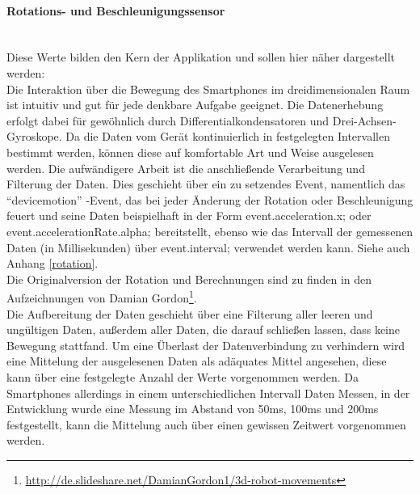 \documentclass[a4paper]{spie}  %
\begin{document}
		\paragraph{Rotations- und Beschleunigungssensor}\mbox{}\\
Diese Werte bilden den Kern der Applikation und sollen hier näher dargestellt werden:\\
Die Interaktion über die Bewegung des Smartphones im dreidimensionalen Raum ist intuitiv und gut für jede denkbare Aufgabe geeignet. Die Datenerhebung erfolgt dabei für gewöhnlich durch Differentialkondensatoren und Drei-Achsen-Gyroskope.
Da die Daten vom Gerät kontinuierlich in festgelegten Intervallen bestimmt werden, können diese auf komfortable Art und Weise ausgelesen werden. Die aufwändigere Arbeit ist die anschließende Verarbeitung und Filterung der Daten. Dies geschieht über ein zu setzendes Event, namentlich das \enquote{devicemotion} -Event, das bei jeder Änderung der Rotation oder Beschleunigung feuert und seine Daten beispielhaft in der Form event.acceleration.x; oder event.accelerationRate.alpha; bereitstellt, ebenso wie das Intervall der gemessenen Daten (in Millisekunden) über event.interval; verwendet werden kann. Siehe auch Anhang \ref{rotation}.\\
Die Originalversion der Rotation und Berechnungen sind zu finden in den Aufzeichnungen von Damian Gordon\footnote{\url{http://de.slideshare.net/DamianGordon1/3d-robot-movements}}.\\
Die Aufbereitung der Daten geschieht über eine Filterung aller leeren und ungültigen Daten, außerdem aller Daten, die darauf schließen lassen, dass keine Bewegung stattfand. Um eine Überlast der Datenverbindung zu verhindern wird eine Mittelung der ausgelesenen Daten als adäquates Mittel angesehen, diese kann über eine festgelegte Anzahl der Werte vorgenommen werden. Da Smartphones allerdings in einem unterschiedlichen Intervall Daten Messen, in der Entwicklung wurde eine Messung im Abstand von 50ms, 100ms und 200ms festgestellt, kann die Mittelung auch über einen gewissen Zeitwert vorgenommen werden.
\end{document}

